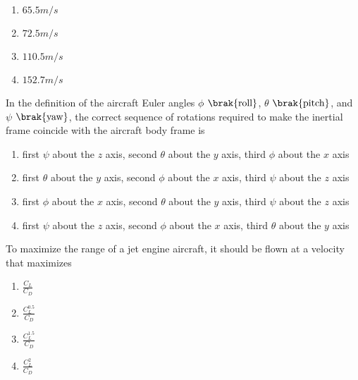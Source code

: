 \begin{enumerate}
    \item $65.5 m/s$
    \item $72.5 m/s$
    \item $110.5 m/s$
    \item $152.7 m/s$
\end{enumerate}
\item In the definition of the aircraft Euler angles $\phi$ $\brak{\text{roll}}$, $\theta$ $\brak{\text{pitch}}$, and $\psi$ $\brak{\text{yaw}}$, the correct sequence of rotations required to make the inertial frame coincide with the aircraft body frame is
\begin{enumerate}
    \item first $\psi$ about the $z$ axis, second $\theta$ about the $y$ axis, third $\phi$ about the $x$ axis
    \item first $\theta$ about the $y$ axis, second $\phi$ about the $x$ axis, third $\psi$ about the $z$ axis
    \item first $\phi$ about the $x$ axis, second $\theta$ about the $y$ axis, third $\psi$ about the $z$ axis
    \item first $\psi$ about the $z$ axis, second $\phi$ about the $x$ axis, third $\theta$ about the $y$ axis
\end{enumerate}

\item To maximize the range of a jet engine aircraft, it should be flown at a velocity that maximizes
\begin{enumerate}
    \item $\frac{C_L}{C_D}$
    \item $\frac{C_{L}^{0.5}}{C_D}$
    \item $\frac{C_{L}^{1.5}}{C_D}$
    \item $\frac{C_{L}^{2}}{C_{D}}$
\end{enumerate}

